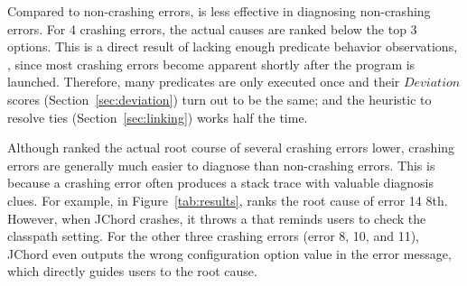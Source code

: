 
Compared to non-crashing errors, \ourtool is less effective
in diagnosing non-crashing errors. For 4 crashing errors,
the actual causes are ranked below the top 3 options.
This is a direct result of lacking enough predicate behavior observations,
,
since most crashing errors become apparent shortly
after the program is launched. Therefore, many predicates are
only executed once and their $Deviation$ scores
 (Section~\ref{sec:deviation}) turn out to be the same; and the heuristic to resolve ties (Section~\ref{sec:linking})
works half the time.




Although \ourtool ranked the actual root course of several
crashing errors lower, crashing errors are generally much easier to diagnose than non-crashing errors.
This is because a crashing error often produces a stack trace with valuable diagnosis clues.
For example, in Figure~\ref{tab:results}, \ourtool ranks the root cause of
error 14  8th.
However, when JChord crashes, it throws a 
that reminds users to check the classpath setting. For the other three crashing errors (error 8, 10, and 11),
JChord even outputs the wrong configuration option value in the
error message, which
directly guides users to the root cause. 









